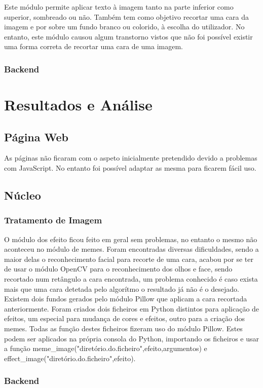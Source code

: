 \documentclass{report}
\begin{document}
Este módulo permite aplicar texto à imagem tanto na parte inferior como superior, sombreado ou não. Também tem como objetivo recortar uma cara da imagem e por sobre um fundo branco ou colorido, à escolha do utilizador. No entanto, este módulo causou algum transtorno vistos que não foi possível existir uma forma correta de recortar uma cara de uma imagem.

\subsection{Backend}


\chapter{Resultados e Análise}
\label{chap.res}

\section{Página Web}
	As páginas não ficaram com o aspeto inicialmente pretendido devido a problemas com JavaScript. No entanto foi possível adaptar as mesma para ficarem fácil uso.
\section{Núcleo}	
\subsection{Tratamento de Imagem}
	O módulo dos efeito ficou feito em geral sem problemas, no entanto o mesmo não aconteceu no módulo de memes. Foram encontradas diversas dificuldades, sendo a maior delas o reconhecimento facial para recorte de uma cara, acabou por se ter de usar o módulo OpenCV para o reconhecimento dos olhos e face, sendo recortado num retângulo a cara encontrada, um problema conhecido é caso exista mais que uma cara detetada pelo algorítmo o resultado já não é o desejado. Existem dois fundos gerados pelo módulo Pillow que aplicam a cara recortada anteriormente.
	Foram criados dois ficheiros em Python distintos para aplicação de efeitos, um especial para mudança de cores e efeitos, outro para a criação dos memes. Todas as função destes ficheiros fizeram uso do módulo Pillow. Estes podem ser aplicados na própria consola do Python, importando os ficheiros e usar a função meme\_image("diretório.do.ficheiro",efeito,argumentos) 
e effect\_image("diretório.do.ficheiro",efeito).
\subsection{Backend}
\end{document}
